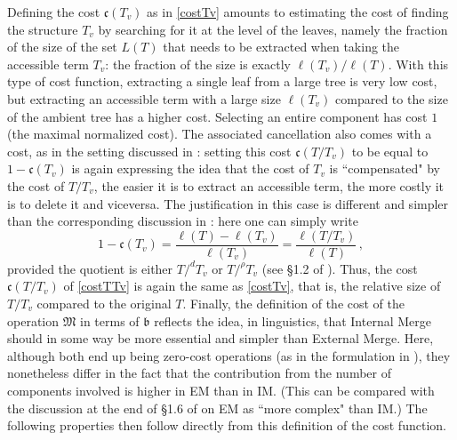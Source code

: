 \documentclass[12pt]{amsart}
\numberwithin{equation}{section}
\def\fM{{\mathfrak M}}
\def\fc{{\mathfrak c}}
\def\fb{{\mathfrak b}}
\begin{document}
  Defining the cost $\fc(T_v)$ as in \eqref{costTv} amounts to estimating the cost of
  finding the structure $T_v$ by searching for it at the level of the leaves, namely
  the fraction of the size of the set $L(T)$ that needs to be extracted when taking the
  accessible term $T_v$: the fraction of the size is exactly $\ell(T_v)/\ell(T)$. With this
  type of cost function, extracting a single leaf from a large tree is very low cost, but
  extracting an accessible term with a large size $\ell(T_v)$ compared to the size
  of the ambient tree has a higher cost. Selecting an entire component has cost $1$ (the maximal normalized cost).
  The associated cancellation also comes with a cost, as in the setting discussed
  in \cite{MCB}: setting this cost $\fc(T/T_v)$ to be equal to $1-\fc(T_v)$ is again
  expressing the idea that the cost of $T_v$ is ``compensated" by the cost of $T/T_v$,
  the easier it is to extract an accessible term, the more costly it is to delete it and
  viceversa. The justification in this case is different and simpler than the corresponding
  discussion in \cite{MCB}: here one can simply write 
  $$ 1-\fc(T_v)=\frac{\ell(T)-\ell(T_v)}{\ell(T_v)} = \frac{\ell(T/T_v)}{\ell(T)} \, , $$
  provided the quotient is either $T/^d T_v$ or $T/^\rho T_v$ (see \S 1.2 of \cite{MCB}).
  Thus, the cost $\fc(T/T_v)$ of \eqref{costTTv} is again the same as \eqref{costTv},
  that is, the relative size of $T/T_v$ compared to the original $T$. Finally,
  the definition of the cost of the operation $\fM$ in terms of $\fb$ reflects the
  idea, in linguistics, that Internal Merge should in some way be more essential
  and simpler than External Merge. Here, although both end up being zero-cost
  operations (as in the formulation in \cite{MCB}), they nonetheless differ in
  the fact that the contribution from the number of components involved is
  higher in EM than in IM. (This can be compared with the discussion at the end
  of \S 1.6 of \cite{MCB} on EM as ``more complex" than IM.)  The following properties
  then follow directly from this definition of the cost function.
  
\end{document}
